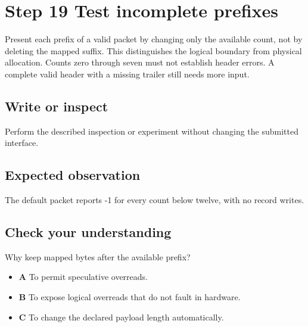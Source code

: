 \section{Step 19 Test incomplete prefixes}\label{packet-s19}

Present each prefix of a valid packet by changing only the available count, not by deleting the mapped suffix. This distinguishes the logical boundary from physical allocation. Counts zero through seven must not establish header errors. A complete valid header with a missing trailer still needs more input.

\subsection{Write or inspect}
Perform the described inspection or experiment without changing the submitted interface.

\subsection{Expected observation}
The default packet reports -1 for every count below twelve, with no record writes.

\subsection{Check your understanding}
Why keep mapped bytes after the available prefix?

\begin{itemize}
  \item \textbf{A} To permit speculative overreads.
  \item \textbf{B} To expose logical overreads that do not fault in hardware.
  \item \textbf{C} To change the declared payload length automatically.
\end{itemize}
